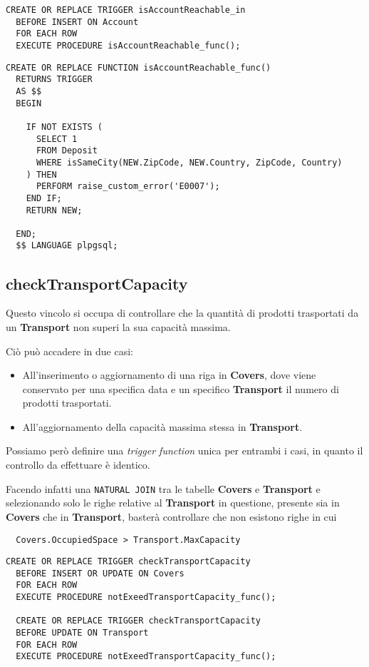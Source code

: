 \begin{lstlisting}[caption={Trigger per il vincolo \textbf{isAccountReachable}}]
  CREATE OR REPLACE TRIGGER isAccountReachable_in
  BEFORE INSERT ON Account
  FOR EACH ROW
  EXECUTE PROCEDURE isAccountReachable_func();
\end{lstlisting}

\begin{lstlisting}[caption={Funzione per il vincolo \textbf{isAccountReachable}}]
  CREATE OR REPLACE FUNCTION isAccountReachable_func()
  RETURNS TRIGGER
  AS $$
  BEGIN

    IF NOT EXISTS (
      SELECT 1
      FROM Deposit
      WHERE isSameCity(NEW.ZipCode, NEW.Country, ZipCode, Country)
    ) THEN
      PERFORM raise_custom_error('E0007');
    END IF;
    RETURN NEW;

  END;
  $$ LANGUAGE plpgsql;
\end{lstlisting}

\subsection{\textbf{checkTransportCapacity}}

Questo vincolo si occupa di controllare che la quantità di prodotti trasportati da un \textbf{Transport} non superi la sua capacità massima. 

Ciò può accadere in due casi:
\begin{itemize}
  \item All'inserimento o aggiornamento di una riga in \textbf{Covers}, dove viene conservato per una specifica data e un specifico \textbf{Transport} il numero di prodotti trasportati.
  \item All'aggiornamento della capacità massima stessa in \textbf{Transport}.
\end{itemize}

Possiamo però definire una \textit{trigger function} unica per entrambi i casi, in quanto il controllo da effettuare è identico.

Facendo infatti una \lstinline{NATURAL JOIN} tra le tabelle \textbf{Covers} e \textbf{Transport} e selezionando solo le righe relative al \textbf{Transport} in questione, presente sia in \textbf{Covers} che in \textbf{Transport}, basterà controllare che non esistono righe in cui 
\begin{lstlisting}
  Covers.OccupiedSpace > Transport.MaxCapacity
\end{lstlisting}

\begin{lstlisting}[caption={Trigger per il vincolo \textbf{checkTransportCapacity}}]
  CREATE OR REPLACE TRIGGER checkTransportCapacity
  BEFORE INSERT OR UPDATE ON Covers
  FOR EACH ROW
  EXECUTE PROCEDURE notExeedTransportCapacity_func();

  CREATE OR REPLACE TRIGGER checkTransportCapacity
  BEFORE UPDATE ON Transport
  FOR EACH ROW
  EXECUTE PROCEDURE notExeedTransportCapacity_func();
\end{lstlisting}


